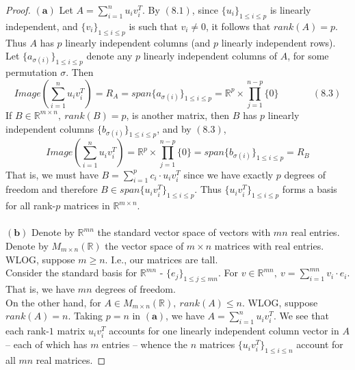 \documentclass[11pt]{article}
\theoremstyle{quest}
\begin{document}
\begin{proof}
$\mathbf{(a)}$ Let $A = \sum_{i=1}^n u_i v_i^T$. By $(8.1)$, since $\{u_i\}_{1 \le i \le p}$ is linearly independent, and $\{v_i\}_{1 \le i \le p}$ is such that $v_i \ne 0$, it follows that $rank(A) = p$. Thus $A$ has $p$ linearly independent columns (and $p$ linearly independent rows). Let $\{a_{\sigma(i)}\}_{1 \le i \le p}$ denote any $p$ linearly independent columns of $A$, for some permutation $\sigma$. Then
$$Image(\sum_{i=1}^n u_i v_i^T) = R_A = span\{a_{\sigma(i)}\}_{1 \le i \le p} = \mathbb{R}^p \times \prod_{j = 1}^{n-p} \{0\}\ \ \ \ \ \ \ \ \ \ \ \ \ \ \ \ (8.3)$$
If $B \in \mathbb{R}^{m \times n},\ rank(B) = p$, is another matrix, then $B$ has $p$ linearly independent columns $\{b_{\sigma(i)}\}_{1 \le i \le p}$, and by $(8.3)$,
$$Image(\sum_{i=1}^n u_i v_i^T) = \mathbb{R}^p \times \prod_{j = 1}^{n-p} \{0\} = span\{b_{\sigma(i)}\}_{1 \le i \le p} = R_B$$
That is, we must have $B = \sum_{i=1}^p c_i \cdot u_i v_i^T$ since we have exactly $p$ degrees of freedom and therefore $B \in span\{u_iv_i^T\}_{1 \le i \le p}$. Thus $\{u_iv_i^T\}_{1 \le i \le p}$ forms a basis for all rank-$p$ matrices in $\mathbb{R}^{m \times n}$.
\\\\$\mathbf{(b)}$ Denote by $\mathbb{R}^{mn}$ the standard vector space of vectors with $mn$ real entries. Denote by $M_{m \times n}(\mathbb{R})$ the vector space of $m \times n$ matrices with real entries. WLOG, suppose $m \ge n$. I.e., our matrices are tall.
\\Consider the standard basis for $\mathbb{R}^{mn}$ - $\{e_j\}_{1 \le j \le mn}$. For $v \in \mathbb{R}^{mn},\ v = \sum_{i=1}^{mn} v_i \cdot e_i$.  That is, we have $mn$ degrees of freedom.
\\On the other hand, for $A \in M_{m \times n}(\mathbb{R}),\ rank(A) \le n$. WLOG, suppose $rank(A) = n$. Taking $p=n$ in $\mathbf{(a)}$, we have $A = \sum_{i=1}^n u_iv_i^T$. We see that each rank-$1$ matrix $u_i v_i^T$ accounts for one linearly independent column vector in $A$ -- each of which has $m$ entries -- whence the $n$ matrices $\{u_i v_i^T\}_{1 \le i \le n}$ account for all $mn$ real matrices.
\end{proof}
\end{document}
